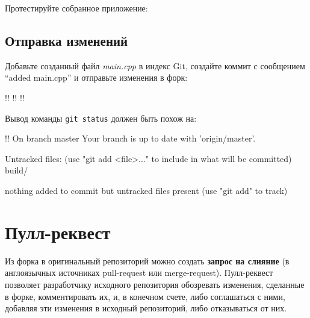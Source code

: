 \documentclass[14pt]{extarticle}
\begin{document}
    Протестируйте собранное приложение:


    \subsection{Отправка изменений}

    Добавьте созданный файл \textit{main.cpp} в индекс Git, создайте коммит
    с сообщением \enquote{added main.cpp} и отправьте изменения в форк:

    \begin{terminalwindow}
!!
!!
!!
    \end{terminalwindow}

    Вывод команды \verb|git status| должен быть похож на:

    \begin{terminalwindow}
!!
On branch master
Your branch is up to date with 'origin/master'.

Untracked files:
  (use "git add <file>..." to include in what will be committed)
        build/

nothing added to commit but untracked files present (use "git add" to track)
    \end{terminalwindow}

\section{Пулл-реквест}

    Из форка\footnotemark{} в оригинальный репозиторий можно создать \textbf{запрос на слияние}
    (в англоязычных источниках pull-request или merge-request).
    Пулл-реквест позволяет разработчику исходного репозитория обозревать изменения,
    сделанные в форке, комментировать их, и, в конечном счете, либо соглашаться с ними,
    добавляя эти изменения в исходный репозиторий, либо отказываться от них.

\end{document}
